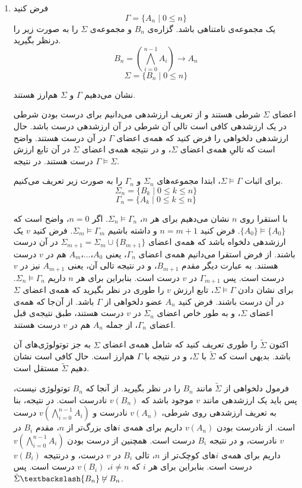 \documentclass[12pt, 14paper]{article}
\begin{document}
\begin{enumerate}
\begin{ans}
\begin{enumerate}
    \item
    فرض کنید
    $$ \Gamma = \{ A_n \mid 0 \leq n \} $$
    یک مجموعه‌ی نامتناهی باشد.
    گزاره‌ی $B_n$ و مجموعه‌ی $\Sigma$ را به صورت زیر را درنظر بگیرید.
    $$ B_n = (\bigwedge_{i=0}^{n-1} A_i) \rightarrow A_n $$
    $$ \Sigma = \{ B_n \mid 0 \leq n \} $$

    نشان می‌دهیم $\Gamma$ و $\Sigma$ هم‌ارز هستند.

    اعضای $\Sigma$ شرطی هستند و از تعریف ارزشدهی می‌دانیم برای درست بودن شرطی در یک ارزشدهی کافی است تالی آن شرطی در آن ارزشدهی درست باشد. حال ارزشدهی دلخواهی را فرض کنید که همه‌ی اعضای $\Gamma$ در آن درست هستند. واضح است که تالیِ همه‌ی اعضای $\Sigma$، و در نتیجه همه‌ی اعضای $\Sigma$ در آن تابع ارزش درست هستند. در نتیجه $\Gamma \vDash \Sigma$.

    برای اثبات $\Sigma \vDash \Gamma$، ابتدا
    مجموعه‌های $\Sigma_n$ و $\Gamma_n$ را به صورت زیر تعریف می‌کنیم.
    $$ \Sigma_n = \{ B_k \mid 0 \leq k \leq n \} $$
    $$ \Gamma_n = \{ A_k \mid 0 \leq k \leq n \} $$

    با استقرا روی $n$ نشان می‌دهیم برای هر $n$، $\Sigma_n \vDash \Gamma_n$.
    اگر $n=0$، واضح است که $\{A_0\} \vDash \{A_0\}$. فرض کنید $n=m+1$ و داشته باشیم $\Sigma_m \vDash \Gamma_m$. فرض کنید $v$ یک ارزشدهی دلخواه باشد که همه‌ی اعضای $\Sigma_{m+1} = \Sigma_m \cup \{ B_{m+1} \}$ در آن درست باشند. از فرض استقرا می‌دانیم همه‌ی اعضای $\Gamma_n$، یعنی $A_0$،...،$A_m$ هم در $v$ درست هستند. به عبارت دیگر مقدم $B_{m+1}$، و در نتیجه تالی آن، یعنی $A_{m+1}$ نیز در $v$ درست است. پس $\Gamma_{m+1}$ در $v$ درست است. بنابراین برای هر $n$ داریم $\Sigma_n \vDash \Gamma_n$. برای نشان دادن $\Sigma \vDash \Gamma$، تابع ارزش $v$ را طوری در نظر بگیرید که همه‌ی اعضای $\Sigma$ در آن درست باشند. فرض کنید $A_n$ عضو دلخواهی از $\Gamma$ باشد. از آن‌جا که همه‌ی اعضای $\Sigma$، و به طور خاص اعضای $\Sigma_n$ در $v$ درست هستند، طبق نتیجه‌ی قبل اعضای $\Gamma_n$، از جمله $A_n$ هم در $v$ درست هستند.

    اکنون $\tilde{\Sigma}$ را طوری تعریف کنید که شامل همه‌ی اعضای $\Sigma$ به جز توتولوژی‌های آن باشد. بدیهی است که $\tilde{\Sigma}$ با $\Sigma$، و در نتیجه با $\Gamma$ هم‌ارز است. حال کافی است نشان دهیم $\tilde{\Sigma}$ مستقل است.

    فرمول دلخواهی از $\tilde{\Sigma}$ مانند $B_n$ را در نظر بگیرید. از آنجا که $B_n$ توتولوژی نیست، پس باید یک ارزشدهی مانند $v$ موجود باشد که $v(B_n)$ نادرست است. در نتیجه، بنا به تعریف ارزشدهی روی شرطی، $v(A_n)$ نادرست و $v(\bigwedge_{i=0}^{n-1} A_i)$ درست است. از نادرست بودن $v(A_n)$ داریم برای همه‌ی $i$های بزرگ‌تر از $n$، مقدم $B_i$ در $v$ نادرست، و در نتیجه $B_i$ درست است. همچنین از درست بودن $v(\bigwedge_{i=0}^{n-1} A_i)$ داریم برای همه‌ی $i$های کوچک‌تر از $n$، تالی $B_i$ در $v$ درست، و درنتیجه $v(B_i)$ درست است. بنابراین برای هر $i$ که $i \neq n$، $v(B_i)$ درست است. پس $\tilde{\Sigma}\textbackslash\{B_n\} \not\vDash B_n$.


\end{enumerate}
\end{ans}
\end{enumerate}
\end{document}
